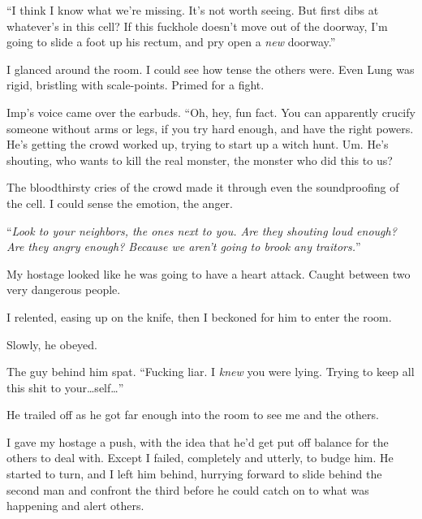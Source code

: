 ``I think I know what we're missing.  It's not worth seeing.  But first dibs at whatever's in this cell?  If this fuckhole doesn't move out of the doorway, I'm going to slide a foot up his rectum, and pry open a \emph{new} doorway.''



I glanced around the room.  I could see how tense the others were.  Even Lung was rigid, bristling with scale-points.  Primed for a fight.



Imp's voice came over the earbuds.  ``Oh, hey, fun fact.  You can apparently crucify someone without arms or legs, if you try hard enough, and have the right powers.  He's getting the crowd worked up, trying to start up a witch hunt.  Um.  He's shouting, who wants to kill the real monster, the monster who did this to us?



The bloodthirsty cries of the crowd made it through even the soundproofing of the cell.  I could sense the emotion, the anger.



``\emph{Look to your neighbors, the ones next to you.  Are they shouting loud enough?  Are they angry enough?  Because we aren't going to brook any traitors.}''



My hostage looked like he was going to have a heart attack.  Caught between two very dangerous people.



I relented, easing up on the knife, then I beckoned for him to enter the room.



Slowly, he obeyed.



The guy behind him spat.  ``Fucking liar.  I \emph{knew} you were lying.  Trying to keep all this shit to your\ldots self\ldots''



He trailed off as he got far enough into the room to see me and the others.



I gave my hostage a push, with the idea that he'd get put off balance for the others to deal with.  Except I failed, completely and utterly, to budge him.  He started to turn, and I left him behind, hurrying forward to slide behind the second man and confront the third before he could catch on to what was happening and alert others.



